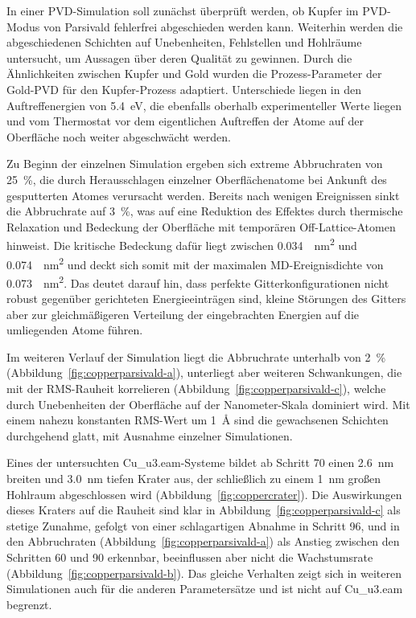 In einer PVD-Simulation soll zunächst überprüft werden, ob Kupfer im PVD-Modus von Parsivald fehlerfrei abgeschieden werden kann.
Weiterhin werden die abgeschiedenen Schichten auf Unebenheiten, Fehlstellen und Hohlräume untersucht, um Aussagen über deren Qualität zu gewinnen.
Durch die Ähnlichkeiten zwischen Kupfer und Gold wurden die Prozess-Parameter der Gold-PVD für den Kupfer-Prozess adaptiert.
Unterschiede liegen in den Auftreffenergien von \SI{5.4}{\electronvolt}, die ebenfalls oberhalb experimenteller Werte liegen und vom Thermostat vor dem eigentlichen Auftreffen der Atome auf der Oberfläche noch weiter abgeschwächt werden.

Zu Beginn der einzelnen Simulation ergeben sich extreme Abbruchraten von \SI{25}{\percent}, die durch Herausschlagen einzelner Oberflächenatome bei Ankunft des gesputterten Atomes verursacht werden.
Bereits nach wenigen Ereignissen sinkt die Abbruchrate auf \SI{3}{\percent}, was auf eine Reduktion des Effektes durch thermische Relaxation und Bedeckung der Oberfläche mit temporären Off-Lattice-Atomen hinweist.
Die kritische Bedeckung dafür liegt zwischen \SI{0.034}{\per\nano\meter\squared} und \SI{0.074}{\per\nano\meter\squared} und deckt sich somit mit der maximalen MD-Ereignisdichte von \SI{0.073}{\per\nano\meter\squared}.
Das deutet darauf hin, dass perfekte Gitterkonfigurationen nicht robust gegenüber gerichteten Energieeinträgen sind, kleine Störungen des Gitters aber zur gleichmäßigeren Verteilung der eingebrachten Energien auf die umliegenden Atome führen.

Im weiteren Verlauf der Simulation liegt die Abbruchrate unterhalb von \SI{2}{\percent} (Abbildung~\ref{fig:copperparsivald-a}), unterliegt aber weiteren Schwankungen, die mit der RMS-Rauheit korrelieren (Abbildung~\ref{fig:copperparsivald-c}), welche durch Unebenheiten der Oberfläche auf der Nanometer-Skala dominiert wird.
Mit einem nahezu konstanten RMS-Wert um \SI{1}{\angstrom} sind die gewachsenen Schichten durchgehend glatt, mit Ausnahme einzelner Simulationen.

Eines der untersuchten Cu\_u3.eam-Systeme bildet ab Schritt 70 einen \SI{2.6}{\nano\meter} breiten und \SI{3.0}{\nano\meter} tiefen Krater aus, der schließlich zu einem \SI{1}{\nano\meter} großen Hohlraum abgeschlossen wird (Abbildung~\ref{fig:coppercrater}).
Die Auswirkungen dieses Kraters auf die Rauheit sind klar in Abbildung~\ref{fig:copperparsivald-c} als stetige Zunahme, gefolgt von einer schlagartigen Abnahme in Schritt 96, und in den Abbruchraten (Abbildung~\ref{fig:copperparsivald-a}) als Anstieg zwischen den Schritten 60 und 90 erkennbar, beeinflussen aber nicht die Wachstumsrate (Abbildung~\ref{fig:copperparsivald-b}).
Das gleiche Verhalten zeigt sich in weiteren Simulationen auch für die anderen Parametersätze und ist nicht auf Cu\_u3.eam begrenzt.

